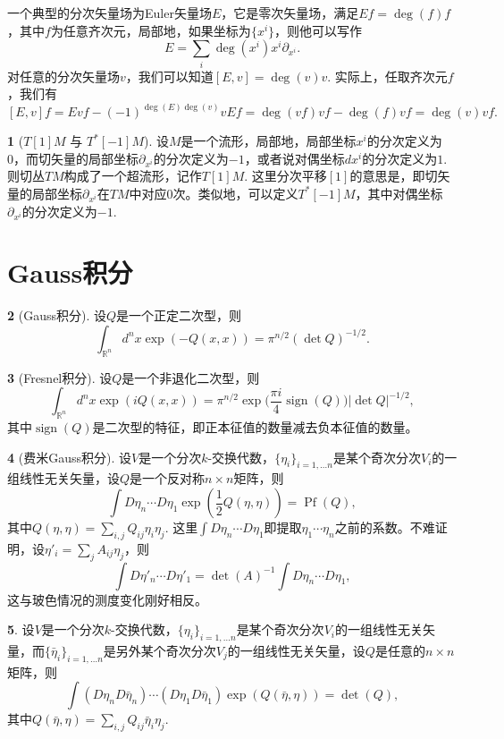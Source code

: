 \documentclass[11pt]{article}
\theoremstyle{definition}
\newtheorem{para}{}[section]
\theoremstyle{plain}
\begin{document}
一个典型的分次矢量场为Euler矢量场$E$，它是零次矢量场，满足$Ef=\deg(f)f$，其中$f$为任意齐次元，局部地，如果坐标为$\{x^i\}$，则他可以写作
\[
    E=\sum_i \deg(x^i)x^i\partial_{x^i}.
\]
对任意的分次矢量场$v$，我们可以知道$[E,v]=\deg(v)v$. 实际上，任取齐次元$f$，我们有
\[
    [E,v]f=Evf-(-1)^{\deg(E) \deg(v)}vEf=\deg(vf)vf-\deg(f)vf=\deg(v)vf.
\]

\begin{para}[${T[1]M}$ 与 ${T^*[-1]M}$]
设$M$是一个流形，局部地，局部坐标$x^i$的分次定义为0，而切矢量的局部坐标$\partial_{x^i}$的分次定义为$-1$，或者说对偶坐标$dx^i$的分次定义为$1$. 则切丛$TM$构成了一个超流形，记作$T[1]M$. 这里分次平移$[1]$的意思是，即切矢量的局部坐标$\partial_{x^i}$在$TM$中对应$0$次。类似地，可以定义${T^*[-1]M}$，其中对偶坐标$\partial_{x^i}$的分次定义为$-1$.
\end{para}

\section{Gauss积分}

\begin{para}[Gauss积分]
    设$Q$是一个正定二次型，则
    \[
        \int_{\mathbb R^n}d^nx \exp(-Q(x,x))=\pi^{n/2}(\det Q)^{-1/2}.
    \]
\end{para}

\begin{para}[Fresnel积分]
    设$Q$是一个非退化二次型，则
    \[
        \int_{\mathbb R^n}d^nx \exp(iQ(x,x))=\pi^{n/2}\exp\biggl(\frac{\pi i}{4} \operatorname{sign}(Q)\biggr)|\det Q|^{-1/2},
    \]
    其中$\operatorname{sign}(Q)$是二次型的特征，即正本征值的数量减去负本征值的数量。
\end{para}

\begin{para}[费米Gauss积分]
    设$V$是一个分次$k$-交换代数，$\{\eta_i\}_{i=1,\dots n}$是某个奇次分次$V_i$的一组线性无关矢量，设$Q$是一个反对称$n\times n$矩阵，则
    \[
        \int D\eta_n\cdots D\eta_1 \exp\left(\frac{1}{2}Q(\eta,\eta)\right)=\operatorname{Pf}(Q),
    \]
    其中$Q(\eta,\eta)=\sum_{i,j}Q_{ij}\eta_i\eta_j$.
    这里$\int D\eta_n\cdots D\eta_1$即提取$\eta_1\cdots \eta_n$之前的系数。不难证明，设$\eta'_i=\sum_jA_{ij}\eta_j$，则
    \[
        \int D\eta'_n\cdots D\eta'_1=\det(A)^{-1}\int D\eta_n\cdots D\eta_1,
    \]
    这与玻色情况的测度变化刚好相反。
\end{para}

\begin{para}
    设$V$是一个分次$k$-交换代数，$\{\eta_i\}_{i=1,\dots n}$是某个奇次分次$V_i$的一组线性无关矢量，而$\{\bar \eta_i\}_{i=1,\dots n}$是另外某个奇次分次$V_j$的一组线性无关矢量，设$Q$是任意的$n\times n$矩阵，则
    \[
        \int (D\eta_nD\bar\eta_n)\cdots (D\eta_1D\bar\eta_1) \exp\left(Q(\bar\eta,\eta)\right)=\det(Q),
    \]
    其中$Q(\bar\eta,\eta)=\sum_{i,j}Q_{ij}\bar\eta_i\eta_j$.
\end{para}
\end{document}
